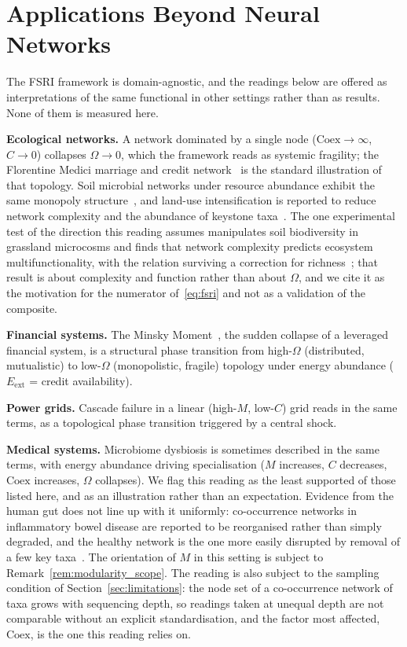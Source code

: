 \documentclass[11pt,a4paper]{article}
\begin{document}
\section{Applications Beyond Neural Networks}
\label{sec:applications}

The FSRI framework is domain-agnostic, and the readings below are offered
as interpretations of the same functional in other settings rather than as
results. None of them is measured here.

\textbf{Ecological networks.} A network dominated by a single node
($\mathrm{Coex} \to \infty$, $C \to 0$) collapses $\Omega \to 0$, which the
framework reads as systemic fragility; the Florentine Medici marriage and
credit network~\cite{padgett1993} is the standard illustration of that
topology. Soil microbial networks under resource abundance exhibit the same
monopoly structure~\cite{ortiz2021}, and land-use intensification is reported
to reduce network complexity and the abundance of keystone
taxa~\cite{banerjee2019}. The one experimental test of the direction this
reading assumes manipulates soil biodiversity in grassland microcosms and
finds that network complexity predicts ecosystem multifunctionality, with the
relation surviving a correction for richness~\cite{wagg2019}; that result is
about complexity and function rather than about $\Omega$, and we cite it as
the motivation for the numerator of~\eqref{eq:fsri} and not as a validation of
the composite.

\textbf{Financial systems.} The Minsky Moment~\cite{minsky1986}, the
sudden collapse of a leveraged financial system, is a structural
phase transition from high-$\Omega$ (distributed, mutualistic) to
low-$\Omega$ (monopolistic, fragile) topology under energy abundance
($E_\text{ext}$ = credit availability).

\textbf{Power grids.} Cascade failure in a linear (high-$M$, low-$C$) grid
reads in the same terms, as a topological phase transition triggered by a
central shock.

\textbf{Medical systems.} Microbiome dysbiosis is sometimes described in the
same terms, with energy abundance driving specialisation ($M$ increases, $C$
decreases, $\mathrm{Coex}$ increases, $\Omega$ collapses). We flag this
reading as the least supported of those listed here, and as an illustration
rather than an expectation. Evidence from the human gut does not line up with
it uniformly: co-occurrence networks in inflammatory bowel disease are
reported to be reorganised rather than simply degraded, and the healthy
network is the one more easily disrupted by removal of a few key
taxa~\cite{baldassano2016}. The orientation of $M$ in this setting is subject
to Remark~\ref{rem:modularity_scope}. The reading is also subject
to the sampling condition of Section~\ref{sec:limitations}: the node set of
a co-occurrence network of taxa grows with sequencing depth, so readings
taken at unequal depth are not comparable without an explicit
standardisation, and the factor most affected, $\mathrm{Coex}$, is the one
this reading relies on.
\end{document}

